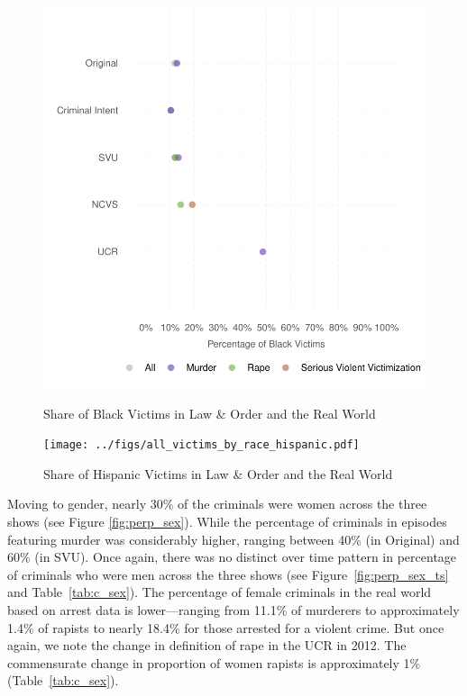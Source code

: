 \documentclass[12pt, letterpaper]{article}
\begin{document}
\begin{figure}[htbp]
\centering
\caption{Share of Black Victims in Law \& Order and the Real World}
\includegraphics[scale=.9]{../figs/all_victims_by_race.pdf}
\label{fig:victim_race}
\end{figure}

\begin{figure}[htbp]
\centering
\caption{Share of Hispanic Victims in Law \& Order and the Real World}
\texttt{[image: ../figs/all\_victims\_by\_race\_hispanic.pdf]}
\label{fig:victim_race_hispanic}
\end{figure}

Moving to gender, nearly 30\% of the criminals were women across the three shows (see Figure \ref{fig:perp_sex}). While the percentage of criminals in episodes featuring murder was considerably higher, ranging between 40\% (in Original) and 60\% (in SVU). Once again, there was no distinct over time pattern in percentage of criminals who were men across the three shows (see Figure~\ref{fig:perp_sex_ts} and Table~\ref{tab:c_sex}). The percentage of female criminals in the real world based on arrest data is lower---ranging from 11.1\% of murderers to approximately 1.4\% of rapists to nearly 18.4\% for those arrested for a violent crime. But once again, we note the change in definition of rape in the UCR in 2012. The commensurate change in proportion of women rapists is approximately 1\% (Table~\ref{tab:c_sex}). 
\end{document}
